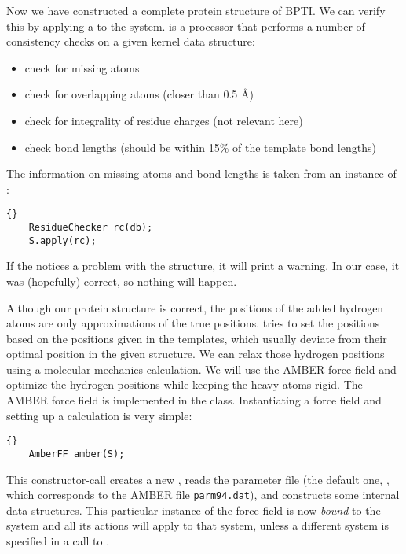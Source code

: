 \noindent
Now we have constructed a complete protein structure of BPTI. We can verify
this by applying a  to the system.
 is a processor that performs a number of consistency
checks on a given kernel data structure:
\begin{itemize}
	\item check for missing atoms
	\item check for overlapping atoms (closer than 0.5 \AA)
	\item check for integrality of residue charges (not relevant here)
	\item check bond lengths (should be within 15\% of the template bond lengths)
\end{itemize}
The information on missing atoms and bond lengths is taken from an instance
of :

\begin{lstlisting}{}
	ResidueChecker rc(db);
	S.apply(rc);
\end{lstlisting}
	
\noindent
If the  notices a problem with the structure, it will 
print a warning. In our case, it was (hopefully) correct, so nothing will
happen.

Although our protein structure is correct, the positions of the added hydrogen
atoms are only approximations of the true positions.
 tries to set the positions based on the
positions given in the  templates, which usually deviate
from their optimal position in the given structure. We can relax those
hydrogen positions using a molecular mechanics calculation.
We will use the AMBER force field\cite{AMBER95} and optimize the hydrogen 
positions while keeping the heavy atoms rigid. The AMBER force field is
implemented in the  class. Instantiating a force field and
setting up a calculation is very simple:

\begin{lstlisting}{}
	AmberFF amber(S);
\end{lstlisting}

\noindent
This constructor-call creates a new , reads the parameter
file (the default one, , which corresponds to the AMBER
file {\tt parm94.dat}), and constructs some internal data structures.
This particular instance of the force field is now {\em bound} to the 
system and all its actions will apply to that system, unless a different
system is specified in a call to .

